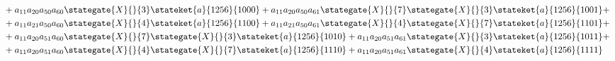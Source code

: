 \begin{align*}
	&+a_{11}a_{20}a_{50}a_{60} \stategate{X}{}{3}\stateket{a}{1256}{1000}+
	  a_{11}a_{20}a_{50}a_{61} \stategate{X}{}{7}\stategate{X}{}{3}\stateket{a}{1256}{1001}+\\
	&+a_{11}a_{21}a_{50}a_{60} \stategate{X}{}{4}\stateket{a}{1256}{1100} +
	  a_{11}a_{21}a_{50}a_{61} \stategate{X}{}{4}\stategate{X}{}{7}\stateket{a}{1256}{1101} +\\
	&+a_{11}a_{20}a_{51}a_{60} \stategate{X}{}{7}\stategate{X}{}{3}\stateket{a}{1256}{1010}+
	  a_{11}a_{20}a_{51}a_{61} \stategate{X}{}{3}\stateket{a}{1256}{1011}+\\
	&+a_{11}a_{20}a_{51}a_{60} \stategate{X}{}{4}\stategate{X}{}{7}\stateket{a}{1256}{1110}+
	  a_{11}a_{20}a_{51}a_{61} \stategate{X}{}{4}\stateket{a}{1256}{1111}\\
\end{align*}

